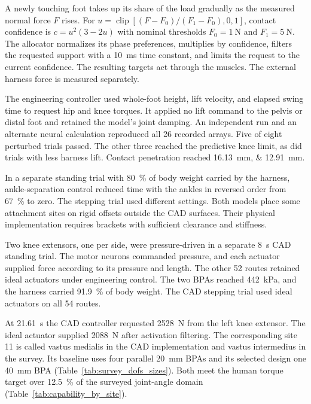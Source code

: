 A newly touching foot takes up its share of the load gradually as the measured normal force $F$ rises. For $u=\operatorname{clip}[(F-F_0)/(F_1-F_0),0,1]$, contact confidence is $c=u^2(3-2u)$ with nominal thresholds $F_0=\qty{1}{\newton}$ and $F_1=\qty{5}{\newton}$. The allocator normalizes its phase preferences, multiplies by confidence, filters the requested support with a \qty{10}{\milli\second} time constant, and limits the request to the current confidence. The resulting targets act through the muscles. The external harness force is measured separately.

The engineering controller used whole-foot height, lift velocity, and elapsed swing time to request hip and knee torques. It applied no lift command to the pelvis or distal foot and retained the model's joint damping. An independent run and an alternate neural calculation reproduced all 26 recorded arrays. Five of eight perturbed trials passed. The other three reached the predictive knee limit, as did trials with less harness lift. Contact penetration reached \qtylist{16.13;12.91}{\milli\meter}.

In a separate standing trial with \qty{80}{\percent} of body weight carried by the harness, ankle-separation control reduced time with the ankles in reversed order from \qty{67}{\percent} to zero. The stepping trial used different settings. Both models place some attachment sites on rigid offsets outside the CAD surfaces. Their physical implementation requires brackets with sufficient clearance and stiffness.

Two knee extensors, one per side, were pressure-driven in a separate \qty{8}{\second} CAD standing trial. The motor neurons commanded pressure, and each actuator supplied force according to its pressure and length. The other 52 routes retained ideal actuators under engineering control. The two BPAs reached \qty{442}{\kPa}, and the harness carried \qty{91.9}{\percent} of body weight. The CAD stepping trial used ideal actuators on all 54 routes.

At \qty{21.61}{\second} the CAD controller requested \qty{2528}{\newton} from the left knee extensor. The ideal actuator supplied \qty{2088}{\newton} after activation filtering. The corresponding site 11 is called vastus medialis in the CAD implementation and vastus intermedius in the survey. Its baseline uses four parallel \qty{20}{\milli\meter} BPAs and its selected design one \qty{40}{\milli\meter} BPA (Table~\ref{tab:survey_dofs_sizes}). Both meet the human torque target over \qty{12.5}{\percent} of the surveyed joint-angle domain (Table~\ref{tab:capability_by_site}).

